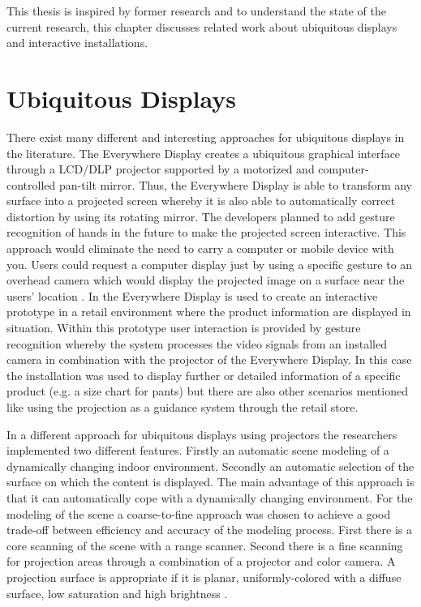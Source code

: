 This thesis is inspired by former research and to understand the state of the current research, this chapter discusses related work about ubiquitous displays and interactive installations.

\section{Ubiquitous Displays}
\label{sec:ud}
There exist many different and interesting approaches for ubiquitous displays in the literature. The Everywhere Display creates a ubiquitous graphical interface through a LCD/DLP projector supported by a motorized and computer-controlled pan-tilt mirror. Thus, the Everywhere Display \cite{Pinhanez2001a} is able to transform any surface into a projected screen whereby it is also able to automatically correct distortion by using its rotating mirror. The developers planned to add gesture recognition of hands in the future to make the projected screen interactive. This approach would eliminate the need to carry a computer or mobile device with you. Users could request a computer display just by using a specific gesture to an overhead camera which would display the projected image on a surface near the users' location \cite{Pinhanez2001a}.
In \cite{Sukaviriya2003} the Everywhere Display is used to create an interactive prototype in a retail environment where the product information are displayed in situation. Within this prototype user interaction is provided by gesture recognition whereby the system processes the video signals from an installed camera in combination with the projector of the Everywhere Display. In this case the installation was used to display further or detailed information of a specific product (e.g. a size chart for pants) but there are also other scenarios mentioned like using the projection as a guidance system through the retail store.

In a different approach for ubiquitous displays using projectors the researchers implemented two different features. Firstly an automatic scene modeling of a dynamically changing indoor environment. Secondly an automatic selection of the surface on which the content is displayed. The main advantage of this approach is that it can automatically cope with a dynamically changing environment. For the modeling of the scene a coarse-to-fine approach was chosen to achieve a good trade-off between efficiency and accuracy of the modeling process. First there is a core scanning of the scene with a range scanner. Second there is a fine scanning for projection areas through a combination of a projector and  color camera. A projection surface is appropriate if it is planar, uniformly-colored with a diffuse surface, low saturation and high brightness \cite{Tokuda2003a}. 

